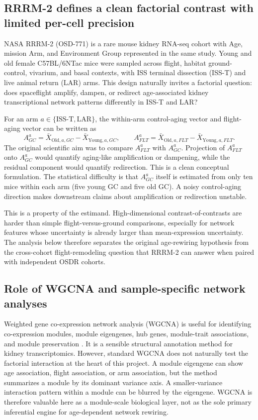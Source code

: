 \documentclass[11pt]{article}
\begin{document}
\subsection{RRRM-2 defines a clean factorial contrast with limited per-cell precision}

NASA RRRM-2 (OSD-771) is a rare mouse kidney RNA-seq cohort with Age, mission Arm, and Environment Group represented in the same study. Young and old female C57BL/6NTac mice were sampled across flight, habitat ground-control, vivarium, and basal contexts, with ISS terminal dissection (ISS-T) and live animal return (LAR) arms. This design naturally invites a factorial question: does spaceflight amplify, dampen, or redirect age-associated kidney transcriptional network patterns differently in ISS-T and LAR?

For an arm $a\in\{\mathrm{ISS\mbox{-}T},\mathrm{LAR}\}$, the within-arm control-aging vector and flight-aging vector can be written as
\begin{equation}
A^a_{GC}=\bar{X}_{\mathrm{Old},a,GC}-\bar{X}_{\mathrm{Young},a,GC},
\qquad
A^a_{FLT}=\bar{X}_{\mathrm{Old},a,FLT}-\bar{X}_{\mathrm{Young},a,FLT}.
\end{equation}
The original scientific aim was to compare $A^a_{FLT}$ with $A^a_{GC}$. Projection of $A^a_{FLT}$ onto $A^a_{GC}$ would quantify aging-like amplification or dampening, while the residual component would quantify redirection. This is a clean conceptual formulation. The statistical difficulty is that $A^a_{GC}$ itself is estimated from only ten mice within each arm (five young GC and five old GC). A noisy control-aging direction makes downstream claims about amplification or redirection unstable.

This is a property of the estimand. High-dimensional contrast-of-contrasts are harder than simple flight-versus-ground comparisons, especially for network features whose uncertainty is already larger than mean-expression uncertainty. The analysis below therefore separates the original age-rewiring hypothesis from the cross-cohort flight-remodeling question that RRRM-2 can answer when paired with independent OSDR cohorts.

\subsection{Role of WGCNA and sample-specific network analyses}

Weighted gene co-expression network analysis (WGCNA) is useful for identifying co-expression modules, module eigengenes, hub genes, module-trait associations, and module preservation \citep{langfelder2008wgcna,langfelder2011preservation}. It is a sensible structural annotation method for kidney transcriptomics. However, standard WGCNA does not naturally test the factorial interaction at the heart of this project. A module eigengene can show age association, flight association, or arm association, but the method summarizes a module by its dominant variance axis. A smaller-variance interaction pattern within a module can be blurred by the eigengene. WGCNA is therefore valuable here as a module-scale biological layer, not as the sole primary inferential engine for age-dependent network rewiring.
\end{document}
